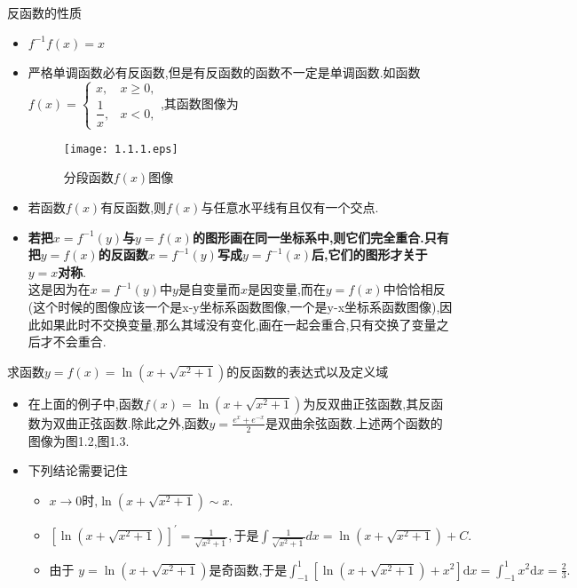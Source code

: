 \documentclass[12pt, a4paper, oneside, UTF8]{ctexbook}  %
\begin{document}
\begin{defn}{反函数的性质}{}
    \begin{itemize}
        \item $f^{-1}f(x)=x$
        \item 严格单调函数必有反函数,但是有反函数的函数不一定是单调函数.如函数$f(x)=\begin{cases}x,&x\geqslant0, \\ \dfrac{1}{x},&x<0,\end{cases}$,其函数图像为
              \begin{figure}[H]
                  \centering \texttt{[image: 1.1.1.eps]} \caption{分段函数$f(x)$图像}
                  \label{xxx1}
              \end{figure}
        \item 若函数$f(x)$有反函数,则$f(x)$与任意水平线有且仅有一个交点.
        \item \textbf{若把$x=f^{-1}(y)$与$y=f(x)$的图形画在同一坐标系中,则它们完全重合.只有把$y=f(x)$的反函数$x=f^{-1}(y)$写成$y=f^{-1}(x)$后,它们的图形才关于 $y=x$对称}.\\这是因为在$x=f^{-1}(y)$中$y$是自变量而$x$是因变量,而在$y=f(x)$中恰恰相反(这个时候的图像应该一个是x-y坐标系函数图像,一个是y-x坐标系函数图像),因此如果此时不交换变量,那么其域没有变化,画在一起会重合,只有交换了变量之后才不会重合.
    \end{itemize}
\end{defn}
\begin{problem}
求函数$y=f(x)=\ln(x+\sqrt{x^2+1})$的反函数的表达式以及定义域
\end{problem}
\begin{note}
    \begin{itemize}
        \item 在上面的例子中,函数$f(x)=\ln(x+\sqrt{x^2+1})$为反双曲正弦函数,其反函数为双曲正弦函数.除此之外,函数$y=\frac{e^x+e^{-x}}{2}$是双曲余弦函数.上述两个函数的图像为图1.2,图1.3.
        \item 下列结论需要记住
              \begin{itemize}
                  \item $x\to0\text{时,}\ln\left(x+\sqrt{x^{2}+1}\right)\sim x.$
                  \item $\left[\ln\left(x+\sqrt{x^{2}+1}\right)\right]^{\prime}=\frac{1}{\sqrt{x^{2}+1}},\text{于是}\int\frac{1}{\sqrt{x^{2}+1}}dx=\ln\left(x+\sqrt{x^{2}+1}\right)+C.$
                  \item $\text{由于 }y=\ln\left(x+\sqrt{x^2+1}\right)\text{是奇函数,于是}\int_{-1}^1\left[\ln\left(x+\sqrt{x^2+1}\right)+x^2\right]\mathrm{d}x=\int_{-1}^1x^2\mathrm{d}x=\frac 23.$
              \end{itemize}
    \end{itemize}
\end{note}
\end{document}
